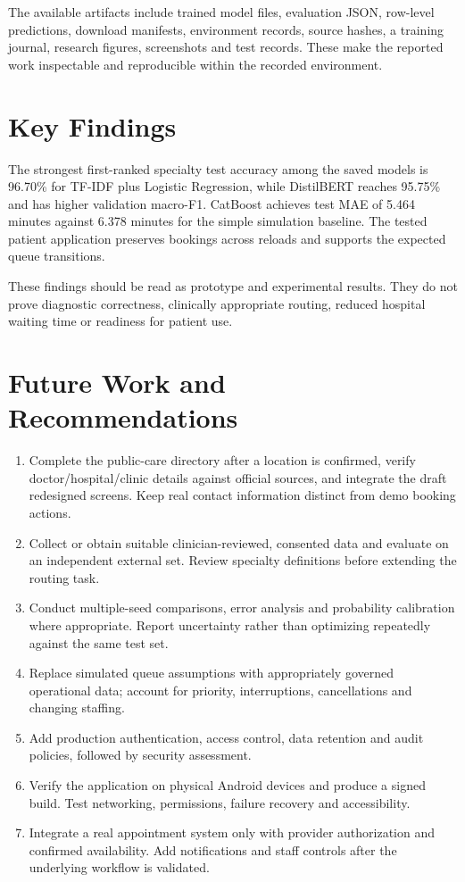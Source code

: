 \documentclass{tietreport}
\begin{document}
The available artifacts include trained model files, evaluation JSON, row-level predictions, download manifests, environment records, source hashes, a training journal, research figures, screenshots and test records. These make the reported work inspectable and reproducible within the recorded environment.

\section{Key Findings}
The strongest first-ranked specialty test accuracy among the saved models is 96.70\% for TF-IDF plus Logistic Regression, while DistilBERT reaches 95.75\% and has higher validation macro-F1. CatBoost achieves test MAE of 5.464 minutes against 6.378 minutes for the simple simulation baseline. The tested patient application preserves bookings across reloads and supports the expected queue transitions.

These findings should be read as prototype and experimental results. They do not prove diagnostic correctness, clinically appropriate routing, reduced hospital waiting time or readiness for patient use.

\section{Future Work and Recommendations}
\begin{enumerate}
\item Complete the public-care directory after a location is confirmed, verify doctor/hospital/clinic details against official sources, and integrate the draft redesigned screens. Keep real contact information distinct from demo booking actions.
\item Collect or obtain suitable clinician-reviewed, consented data and evaluate on an independent external set. Review specialty definitions before extending the routing task.
\item Conduct multiple-seed comparisons, error analysis and probability calibration where appropriate. Report uncertainty rather than optimizing repeatedly against the same test set.
\item Replace simulated queue assumptions with appropriately governed operational data; account for priority, interruptions, cancellations and changing staffing.
\item Add production authentication, access control, data retention and audit policies, followed by security assessment.
\item Verify the application on physical Android devices and produce a signed build. Test networking, permissions, failure recovery and accessibility.
\item Integrate a real appointment system only with provider authorization and confirmed availability. Add notifications and staff controls after the underlying workflow is validated.
\end{enumerate}
\end{document}
